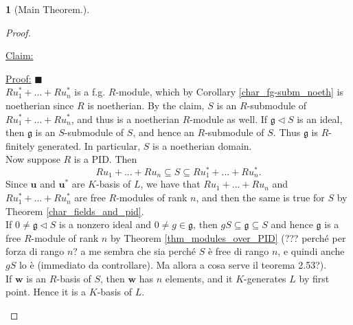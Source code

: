 \documentclass[12pt,a4paper]{report}
\theoremstyle{definition}
\theoremstyle{num.custom-title}
\newtheorem{teo_custom-title}[theorem]{} %
\newenvironment{claim}[1]{\par\noindent\underline{Claim#1:}\space}{} %
\newenvironment{claimproof}[1]{\par\noindent\underline{Proof:}\space#1}{\leavevmode\unskip\penalty9999 \hbox{}\nobreak\hfill\quad\hbox{$\blacksquare$}} %
\DeclareMathOperator{\sse}{\subseteq}
\newcommand{\g}{\mathfrak{g}}
\renewcommand{\u}{\mathbf{u}}
\begin{document}
\begin{teo_custom-title}[Main Theorem.]
\begin{proof}
\begin{enumerate}
\begin{claim}{}
\begin{claimproof}
\end{claimproof}
\end{claim}\\
$R u_1^* + \ldots + R u_n^*$ is a f.g. $R$-module, which by Corollary \ref{char_fg-subm_noeth} is noetherian since $R$ is noetherian. By the claim, $S$ is an $R$-submodule of $R u_1^* + \ldots + R u_n^*$, and thus is a noetherian $R$-module as well. If $\g \lhd S$ is an ideal, then $\g$ is an $S$-submodule of $S$, and hence an $R$-submodule of $S$. Thus $\g$ is $R$-finitely generated. In particular, $S$ is a noetherian domain.\\
Now suppose $R$ is a PID. Then
\[
R u_1 + ... + R u_n \sse S \sse R u_1^* + ... + R u_n^*.
\]
Since $\u$ and $\u^*$ are $K$-basis of $L$, we have that $R u_1 + ... + R u_n$ and $R u_1^* + ... + R u_n^*$ are free $R$-modules of rank $n$, and then the same is true for $S$ by Theorem \ref{char_fields_and_pid}.\\
If $0 \neq \g \lhd S$ is a nonzero ideal and $0 \neq g \in \g$, then $gS \sse \g \sse S$ and hence $\g$ is a free $R$-module of rank $n$ by Theorem \ref{thm_modules_over_PID} (??? perché per forza di rango $n$? a me sembra che sia perché $S$ è free di rango $n$, e quindi anche $gS$ lo è (immediato da controllare). Ma allora a cosa serve il teorema 2.53?).\\
If $\mathbf{w}$ is an $R$-basis of $S$, then $\mathbf{w}$ has $n$ elements, and it $K$-generates $L$ by first point. Hence it is a $K$-basis of $L$.
\end{enumerate}
\end{proof}
\end{teo_custom-title}
\end{document}

